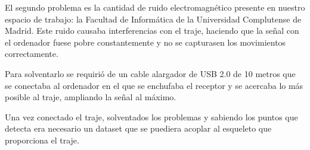 El segundo problema es la cantidad de ruido electromagnético presente en nuestro espacio de trabajo: la Facultad de Informática de la Universidad Complutense de Madrid.
Este ruido causaba interferencias con el traje, haciendo que la señal con el ordenador fuese pobre constantemente y no se capturasen los movimientos correctamente.

Para solventarlo se requirió de un cable alargador de USB 2.0 de 10 metros que se conectaba al ordenador en el que se enchufaba el receptor y se acercaba lo más posible al traje, ampliando la señal al máximo.




Una vez conectado el traje, solventados los problemas y sabiendo los puntos que detecta era necesario un dataset que se puediera acoplar al esqueleto que proporciona el traje.